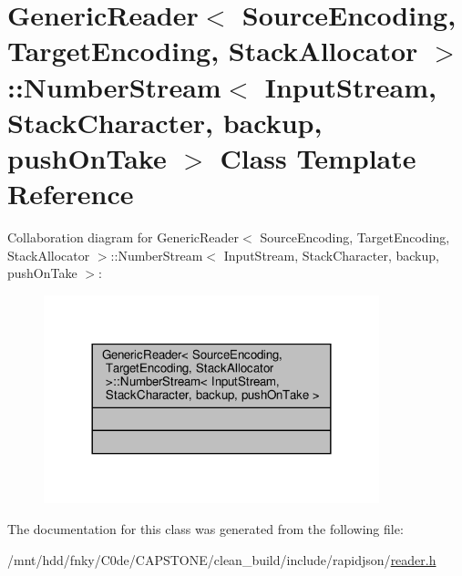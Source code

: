 \hypertarget{classGenericReader_1_1NumberStream}{}\section{Generic\+Reader$<$ Source\+Encoding, Target\+Encoding, Stack\+Allocator $>$\+:\+:Number\+Stream$<$ Input\+Stream, Stack\+Character, backup, push\+On\+Take $>$ Class Template Reference}
\label{classGenericReader_1_1NumberStream}


Collaboration diagram for Generic\+Reader$<$ Source\+Encoding, Target\+Encoding, Stack\+Allocator $>$\+:\+:Number\+Stream$<$ Input\+Stream, Stack\+Character, backup, push\+On\+Take $>$\+:
\nopagebreak
\begin{figure}[H]
\begin{center}
\leavevmode
\includegraphics[width=276pt]{classGenericReader_1_1NumberStream__coll__graph}
\end{center}
\end{figure}


The documentation for this class was generated from the following file\+:\begin{DoxyCompactItemize}
\item 
/mnt/hdd/fnky/\+C0de/\+C\+A\+P\+S\+T\+O\+N\+E/clean\+\_\+build/include/rapidjson/\hyperlink{reader_8h}{reader.\+h}\end{DoxyCompactItemize}
